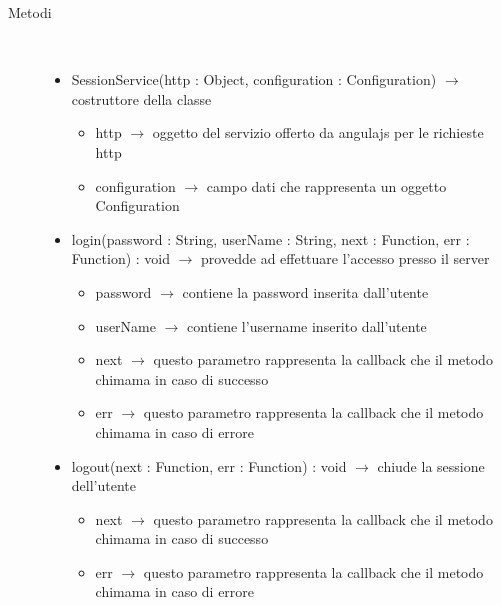 \begin{description}
\item[Metodi] \hfill \\
\vspace{-7mm}
\begin{itemize}
	\item SessionService(http : Object, configuration : Configuration) $\rightarrow$ costruttore della classe\begin{itemize}
		\item http $\rightarrow$ oggetto del servizio offerto da angulajs per le richieste http
		\item configuration $\rightarrow$ campo dati che rappresenta un oggetto Configuration
	\end{itemize}
	
	\item login(password : String, userName : String, next : Function, err : Function) : void $\rightarrow$ provedde ad effettuare l'accesso presso il server\begin{itemize}
		\item password $\rightarrow$ contiene la password inserita dall'utente
		\item userName $\rightarrow$ contiene l'username inserito dall'utente
		\item next $\rightarrow$ questo parametro rappresenta la callback che il metodo chimama in caso di successo
		\item err $\rightarrow$ questo parametro rappresenta la callback che il metodo chimama in caso di errore
	\end{itemize}
	
	\item logout(next : Function, err : Function) : void $\rightarrow$ chiude la sessione dell'utente\begin{itemize}
		\item next $\rightarrow$ questo parametro rappresenta la callback che il metodo chimama in caso di successo
		\item err $\rightarrow$ questo parametro rappresenta la callback che il metodo chimama in caso di errore
	\end{itemize}
	
\end{itemize}

\end{description}

